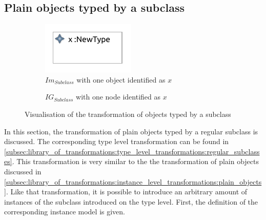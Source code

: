 \subsection{Plain objects typed by a subclass}
\label{subsec:library_of_transformations:instance_level_transformations:objects_of_subtype}

\begin{figure}
    \centering
    \begin{subfigure}{0.45\textwidth}
        \centering
        \includegraphics{images/05_library_of_transformations/03_instance_level_transformations/03_objects_of_subtype/subclass_instance.pdf}
        \caption{$Im_{Subclass}$ with one object identified as $x$}
        \label{fig:library_of_transformations:instance_level_transformations:objects_of_subtype:visualisation:ecore}
    \end{subfigure}
    \begin{subfigure}{0.45\textwidth}
        \centering
        
        \caption{$IG_{Subclass}$ with one node identified as $x$}
        \label{fig:library_of_transformations:instance_level_transformations:objects_of_subtype:visualisation:groove}
    \end{subfigure}
    \caption{Visualisation of the transformation of objects typed by a subclass}
    \label{fig:library_of_transformations:instance_level_transformations:objects_of_subtype:visualisation}
\end{figure}

In this section, the transformation of plain objects typed by a regular subclass is discussed. The corresponding type level transformation can be found in \cref{subsec:library_of_transformations:type_level_transformations:regular_subclasses}. This transformation is very similar to the the transformation of plain objects discussed in \cref{subsec:library_of_transformations:instance_level_transformations:plain_objects}. Like that transformation, it is possible to introduce an arbitrary amount of instances of the subclass introduced on the type level. First, the definition of the corresponding instance model is given.

